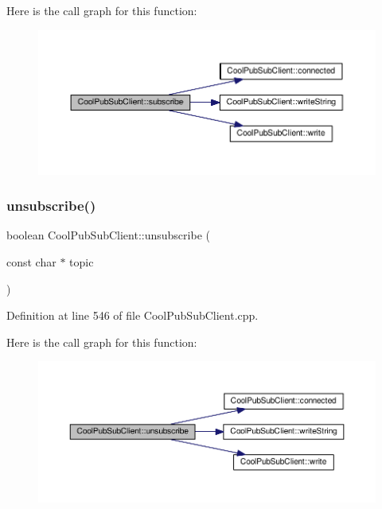 Here is the call graph for this function\+:\nopagebreak
\begin{figure}[H]
\begin{center}
\leavevmode
\includegraphics[width=350pt]{class_cool_pub_sub_client_aebf684e98588c52a72af1014f7957bee_cgraph}
\end{center}
\end{figure}
\mbox{\label{class_cool_pub_sub_client_a850554280e314d6b5c33c73fd9e809fc}} 
\subsubsection{\texorpdfstring{unsubscribe()}{unsubscribe()}}
{\footnotesize\ttfamily boolean Cool\+Pub\+Sub\+Client\+::unsubscribe (\begin{DoxyParamCaption}\item[{const char $\ast$}]{topic }\end{DoxyParamCaption})}



Definition at line 546 of file Cool\+Pub\+Sub\+Client.\+cpp.

Here is the call graph for this function\+:\nopagebreak
\begin{figure}[H]
\begin{center}
\leavevmode
\includegraphics[width=350pt]{class_cool_pub_sub_client_a850554280e314d6b5c33c73fd9e809fc_cgraph}
\end{center}
\end{figure}
\mbox{\label{class_cool_pub_sub_client_a7a8e4854a1846eaa668046d3854d47ad}} 
